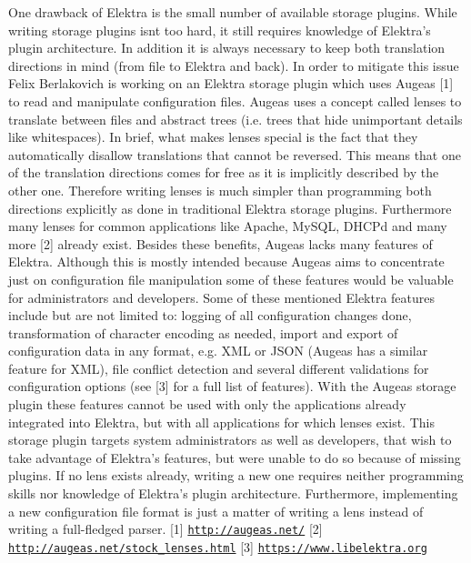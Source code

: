 One drawback of Elektra is the small number of available storage plugins. While writing storage plugins isn\textquotesingle{}t too hard, it still requires knowledge of Elektra’s plugin architecture. In addition it is always necessary to keep both translation directions in mind (from file to Elektra and back). In order to mitigate this issue Felix Berlakovich is working on an Elektra storage plugin which uses Augeas \mbox{[}1\mbox{]} to read and manipulate configuration files. Augeas uses a concept called lenses to translate between files and abstract trees (i.\+e. trees that hide unimportant details like whitespaces). In brief, what makes lenses special is the fact that they automatically disallow translations that cannot be reversed. This means that one of the translation directions comes for free as it is implicitly described by the other one. Therefore writing lenses is much simpler than programming both directions explicitly as done in traditional Elektra storage plugins. Furthermore many lenses for common applications like Apache, My\+S\+QL, D\+H\+C\+Pd and many more \mbox{[}2\mbox{]} already exist. Besides these benefits, Augeas lacks many features of Elektra. Although this is mostly intended because Augeas aims to concentrate just on configuration file manipulation some of these features would be valuable for administrators and developers. Some of these mentioned Elektra features include but are not limited to\+: logging of all configuration changes done, transformation of character encoding as needed, import and export of configuration data in any format, e.\+g. X\+ML or J\+S\+ON (Augeas has a similar feature for X\+ML), file conflict detection and several different validations for configuration options (see \mbox{[}3\mbox{]} for a full list of features). With the Augeas storage plugin these features cannot be used with only the applications already integrated into Elektra, but with all applications for which lenses exist. This storage plugin targets system administrators as well as developers, that wish to take advantage of Elektra’s features, but were unable to do so because of missing plugins. If no lens exists already, writing a new one requires neither programming skills nor knowledge of Elektra’s plugin architecture. Furthermore, implementing a new configuration file format is just a matter of writing a lens instead of writing a full-\/fledged parser. \mbox{[}1\mbox{]} \href{http://augeas.net/}{\tt http\+://augeas.\+net/} \mbox{[}2\mbox{]} \href{http://augeas.net/stock_lenses.html}{\tt http\+://augeas.\+net/stock\+\_\+lenses.\+html} \mbox{[}3\mbox{]} \href{https://www.libelektra.org}{\tt https\+://www.\+libelektra.\+org}

